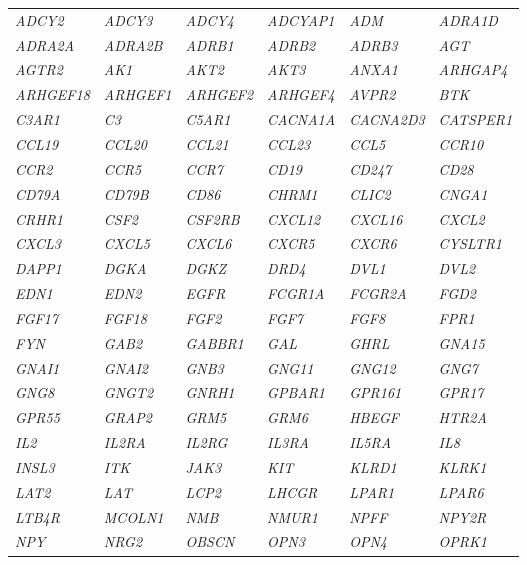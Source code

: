 \begin{longtable}{>{\em}l>{\em}l>{\em}l>{\em}l>{\em}l>{\em}l}
  \hline
  \rowcolor{Cluster_Blue!20}
  ADCY2 & ADCY3 & ADCY4 & ADCYAP1 & ADM & ADRA1D \\ 
  \rowcolor{Cluster_Blue!15} 
  ADRA2A & ADRA2B & ADRB1 & ADRB2 & ADRB3 & AGT \\ 
  \rowcolor{Cluster_Blue!20} 
  AGTR2 & AK1 & AKT2 & AKT3 & ANXA1 & ARHGAP4 \\ 
  \rowcolor{Cluster_Blue!15} 
  ARHGEF18 & ARHGEF1 & ARHGEF2 & ARHGEF4 & AVPR2 & BTK \\ 
  \rowcolor{Cluster_Blue!20} 
  C3AR1 & C3 & C5AR1 & CACNA1A & CACNA2D3 & CATSPER1 \\ 
  \rowcolor{Cluster_Blue!15} 
  CCL19 & CCL20 & CCL21 & CCL23 & CCL5 & CCR10 \\ 
  \rowcolor{Cluster_Blue!20} 
  CCR2 & CCR5 & CCR7 & CD19 & CD247 & CD28 \\ 
  \rowcolor{Cluster_Blue!15} 
  CD79A & CD79B & CD86 & CHRM1 & CLIC2 & CNGA1 \\ 
  \rowcolor{Cluster_Blue!20} 
  CRHR1 & CSF2 & CSF2RB & CXCL12 & CXCL16 & CXCL2 \\ 
  \rowcolor{Cluster_Blue!15} 
  CXCL3 & CXCL5 & CXCL6 & CXCR5 & CXCR6 & CYSLTR1 \\ 
  \rowcolor{Cluster_Blue!20} 
  DAPP1 & DGKA & DGKZ & DRD4 & DVL1 & DVL2 \\ 
  \rowcolor{Cluster_Blue!15} 
  EDN1 & EDN2 & EGFR & FCGR1A & FCGR2A & FGD2 \\ 
  \rowcolor{Cluster_Blue!20} 
  FGF17 & FGF18 & FGF2 & FGF7 & FGF8 & FPR1 \\ 
  \rowcolor{Cluster_Blue!15} 
  FYN & GAB2 & GABBR1 & GAL & GHRL & GNA15 \\ 
  \rowcolor{Cluster_Blue!20} 
  GNAI1 & GNAI2 & GNB3 & GNG11 & GNG12 & GNG7 \\ 
  \rowcolor{Cluster_Blue!15} 
  GNG8 & GNGT2 & GNRH1 & GPBAR1 & GPR161 & GPR17 \\ 
  \rowcolor{Cluster_Blue!20} 
  GPR55 & GRAP2 & GRM5 & GRM6 & HBEGF & HTR2A \\ 
  \rowcolor{Cluster_Blue!15} 
  IL2 & IL2RA & IL2RG & IL3RA & IL5RA & IL8 \\ 
  \rowcolor{Cluster_Blue!20} 
  INSL3 & ITK & JAK3 & KIT & KLRD1 & KLRK1 \\ 
  \rowcolor{Cluster_Blue!15} 
  LAT2 & LAT & LCP2 & LHCGR & LPAR1 & LPAR6 \\ 
  \rowcolor{Cluster_Blue!20} 
  LTB4R & MCOLN1 & NMB & NMUR1 & NPFF & NPY2R \\ 
  \rowcolor{Cluster_Blue!15} 
  NPY & NRG2 & OBSCN & OPN3 & OPN4 & OPRK1 \\ 

\end{longtable}

